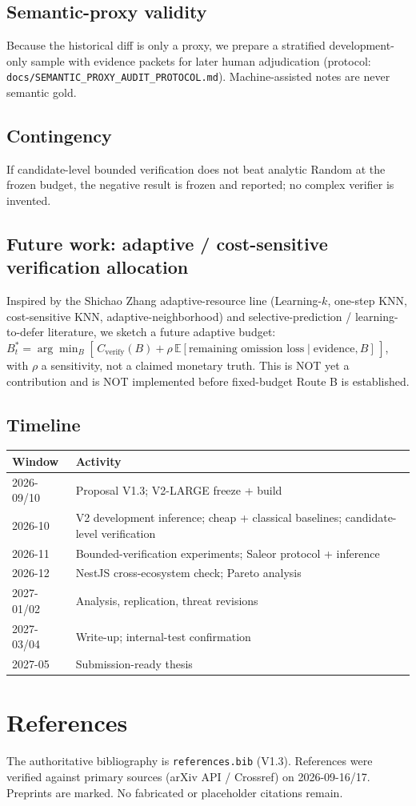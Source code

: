 \documentclass[11pt,a4paper]{article}
\begin{document}
\subsection{Semantic-proxy validity}
Because the historical diff is only a proxy, we prepare a stratified
development-only sample with evidence packets for later human adjudication
(protocol: \texttt{docs/SEMANTIC\_PROXY\_AUDIT\_PROTOCOL.md}). Machine-assisted
notes are never semantic gold.

\subsection{Contingency}
If candidate-level bounded verification does not beat analytic Random at the
frozen budget, the negative result is frozen and reported; no complex verifier
is invented.

\subsection{Future work: adaptive / cost-sensitive verification allocation}
Inspired by the Shichao Zhang adaptive-resource line (Learning-$k$, one-step
KNN, cost-sensitive KNN, adaptive-neighborhood) and selective-prediction /
learning-to-defer literature, we sketch a future adaptive budget: $B_t^* =
\arg\min_B [\,C_{\text{verify}}(B) + \rho\,\mathbb{E}[\text{remaining omission
loss}\mid \text{evidence}, B]\,]$, with $\rho$ a sensitivity, not a claimed
monetary truth. This is NOT yet a contribution and is NOT implemented before
fixed-budget Route B is established.

\subsection{Timeline}
\begin{tabular}{ll}
\toprule
\textbf{Window} & \textbf{Activity} \\
\midrule
2026-09/10 & Proposal V1.3; V2-LARGE freeze + build \\
2026-10 & V2 development inference; cheap + classical baselines; candidate-level verification \\
2026-11 & Bounded-verification experiments; Saleor protocol + inference \\
2026-12 & NestJS cross-ecosystem check; Pareto analysis \\
2027-01/02 & Analysis, replication, threat revisions \\
2027-03/04 & Write-up; internal-test confirmation \\
2027-05 & Submission-ready thesis \\
\bottomrule
\end{tabular}

\section{References}
\label{sec:refs}

The authoritative bibliography is \texttt{references.bib} (V1.3). References
were verified against primary sources (arXiv API / Crossref) on 2026-09-16/17.
Preprints are marked. No fabricated or placeholder citations remain.
\end{document}
